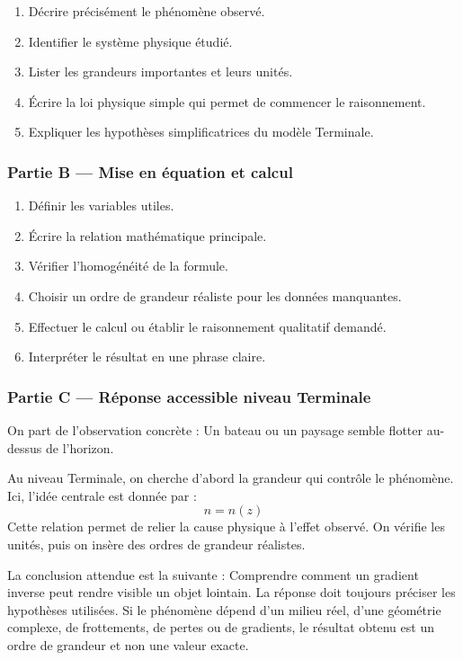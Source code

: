 \documentclass[11pt,a4paper]{article}
\begin{document}
\begin{enumerate}
  \item Décrire précisément le phénomène observé.
  \item Identifier le système physique étudié.
  \item Lister les grandeurs importantes et leurs unités.
  \item Écrire la loi physique simple qui permet de commencer le raisonnement.
  \item Expliquer les hypothèses simplificatrices du modèle Terminale.
\end{enumerate}

\subsubsection*{Partie B — Mise en équation et calcul}

\begin{enumerate}
  \item Définir les variables utiles.
  \item Écrire la relation mathématique principale.
  \item Vérifier l'homogénéité de la formule.
  \item Choisir un ordre de grandeur réaliste pour les données manquantes.
  \item Effectuer le calcul ou établir le raisonnement qualitatif demandé.
  \item Interpréter le résultat en une phrase claire.
\end{enumerate}

\subsubsection*{Partie C — Réponse accessible niveau Terminale}

\begin{corrigebox}
On part de l'observation concrète : Un bateau ou un paysage semble flotter au-dessus de l'horizon.

Au niveau Terminale, on cherche d'abord la grandeur qui contrôle le phénomène. Ici, l'idée centrale est donnée par :
\[
n=n(z)
\]
Cette relation permet de relier la cause physique à l'effet observé. On vérifie les unités, puis on insère des ordres de grandeur réalistes.

La conclusion attendue est la suivante : Comprendre comment un gradient inverse peut rendre visible un objet lointain. La réponse doit toujours préciser les hypothèses utilisées. Si le phénomène dépend d'un milieu réel, d'une géométrie complexe, de frottements, de pertes ou de gradients, le résultat obtenu est un ordre de grandeur et non une valeur exacte.
\end{corrigebox}
\end{document}
